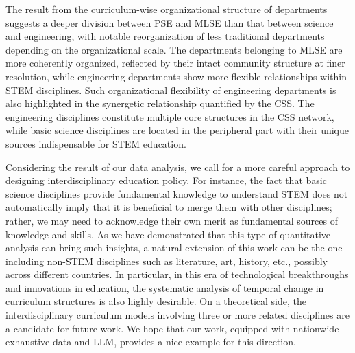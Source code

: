 \documentclass{bmcart}
\begin{document}
The result from the curriculum-wise organizational structure of departments suggests a deeper division between PSE and MLSE than that between science and engineering, with notable reorganization of less traditional departments depending on the organizational scale. The departments belonging to MLSE are more coherently organized, reflected by their intact community structure at finer resolution, while engineering departments show more flexible relationships within STEM disciplines. 
Such organizational flexibility of engineering departments is also highlighted in the synergetic relationship quantified by the CSS. The engineering disciplines constitute multiple core structures in the CSS network, while basic science disciplines are located in the peripheral part with their unique sources indispensable for STEM education. 

Considering the result of our data analysis, we call for a more careful approach to designing interdisciplinary education policy. For instance, the fact that basic science disciplines provide fundamental knowledge to understand STEM does not automatically imply that it is beneficial to merge them with other disciplines; rather, we may need to acknowledge their own merit as fundamental sources of knowledge and skills. 
As we have demonstrated that this type of quantitative analysis can bring such insights, 
a natural extension of this work can be the one including non-STEM disciplines such as literature, art, history, etc., possibly across different countries. In particular, in this era of technological breakthroughs and innovations in education, the systematic analysis of temporal change in curriculum structures is also highly desirable. On a theoretical side, the interdisciplinary curriculum models involving three or more related disciplines are a candidate for future work. We hope that our work, equipped with nationwide exhaustive data and LLM, provides a nice example for this direction.
\end{document}
